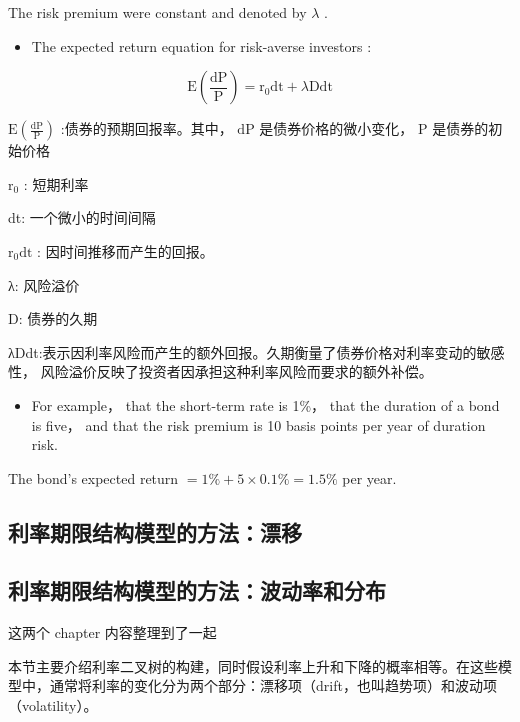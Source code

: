The risk premium were constant and denoted by \(\lambda\) .

\begin{itemize}
\item The expected return equation for risk-averse investors :
\end{itemize}

\[
\mathrm{E}\left( \frac{\mathrm{{dP}}}{\mathrm{P}}\right)  = {\mathrm{r}}_{0}\mathrm{{dt}} + \lambda \mathrm{{Ddt}}
\]

 \(\mathrm{E}\left( \frac{\mathrm{{dP}}}{\mathrm{P}}\right)\) :债券的预期回报率。其中， \(\mathrm{{dP}}\) 是债券价格的微小变化， \(\mathrm{P}\) 是债券的初始价格

 \({\mathrm{r}}_{0}\) : 短期利率

 dt: 一个微小的时间间隔

 \({\mathrm{r}}_{0}\mathrm{{dt}}\) : 因时间推移而产生的回报。

 λ: 风险溢价

 D: 债券的久期

 λDdt:表示因利率风险而产生的额外回报。久期衡量了债券价格对利率变动的敏感性， 风险溢价反映了投资者因承担这种利率风险而要求的额外补偿。

\begin{itemize}
\item For example， that the short-term rate is 1\%， that the duration of a bond is five， and that the risk premium is 10 basis points per year of duration risk.
\end{itemize}

 The bond’s expected return \(= 1\%  + 5 \times  {0.1}\%  = {1.5}\%\) per year.


\subsection{利率期限结构模型的方法：漂移}

\subsection{利率期限结构模型的方法：波动率和分布}




这两个 chapter 内容整理到了一起

本节主要介绍利率二叉树的构建，同时假设利率上升和下降的概率相等。在这些模型中，通常将利率的变化分为两个部分：漂移项（drift，也叫趋势项）和波动项（volatility）。

